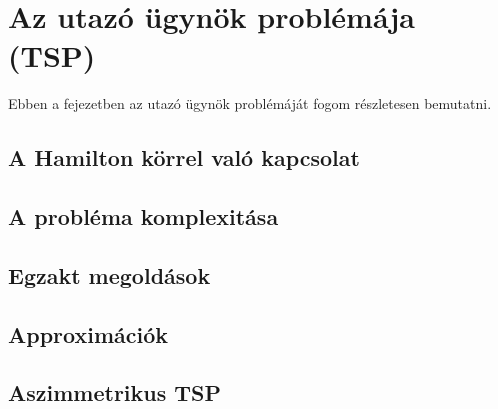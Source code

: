 \chapter{Az utazó ügynök problémája (TSP)}\label{ch:ALAP}

\begin{osszefoglal}
	Ebben a fejezetben az utazó ügynök problémáját fogom részletesen bemutatni.
	
\end{osszefoglal}


\section{A Hamilton körrel való kapcsolat}\label{sec:ALAP:adatelem}

\section{A probléma komplexitása}\label{sec:ALAP:adatelem}

\section{Egzakt megoldások}\label{sec:ALAP:adatelem}

\section{Approximációk}\label{sec:ALAP:adatelem}

\section{Aszimmetrikus TSP}\label{sec:ALAP:adatelem}